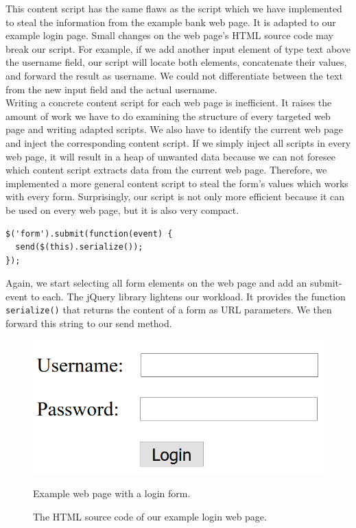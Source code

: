 \documentclass[article,colorback,accentcolor=tud9c,type=bsc]{tudthesis}
\begin{document}
	This content script has the same flaws as the script which we have implemented to steal the information from the example bank web page. It is adapted to our example login page. Small changes on the web page's HTML source code may break our script. For example, if we add another input element of type text above the username field, our script will locate both elements, concatenate their values, and forward the result as username. We could not differentiate between the text from the new input field and the actual username. \\
	
	Writing a concrete content script for each web page is inefficient. It raises the amount of work we have to do examining the structure of every targeted web page and writing adapted scripts. We also have to identify the current web page and inject the corresponding content script. If we simply inject all scripts in every web page, it will result in a heap of unwanted data because we can not foresee which content script extracts data from the current web page. Therefore, we implemented a more general content script to steal the form's values which works with every form. Surprisingly, our script is not only more efficient because it can be used on every web page, but it is also very compact. \\
	
	\begin{lstlisting}
$('form').submit(function(event) {
  send($(this).serialize());
});
	\end{lstlisting}

	Again, we start selecting all form elements on the web page and add an submit-event to each. The jQuery library lightens our workload. It provides the function \texttt{serialize()} that returns the content of a form as URL parameters. We then forward this string to our send method. \\

	\begin{figure}[hp]
		\begin{minipage}{0.5\textwidth}
			\includegraphics[scale=0.4]{lib/login.png}
			\caption[Example login web page]{Example web page with a login form.}
		\end{minipage}
		\begin{minipage}{0.55\textwidth}		
			
			\caption[Example login web page as HTML]{The HTML source code of our example login web page.}
		\end{minipage}
	\end{figure}
\end{document}
